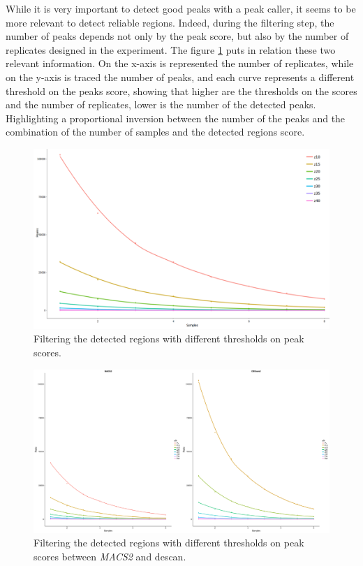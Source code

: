 While it is very important to detect good peaks with a peak caller, it seems to be more relevant to detect reliable regions. Indeed, during the filtering step, the number of peaks depends not only by the peak score, but also by the number of replicates designed in the experiment.
The figure \ref{fig:filteringdescan} puts in relation these two relevant information. 
On the x-axis is represented the number of replicates, while on the y-axis is traced the number of peaks, and each curve represents a different threshold on the peaks score, showing that higher are the thresholds on the scores and the number of replicates, lower is the number of the detected peaks.
Highlighting a proportional inversion between the number of the peaks and the combination of the number of samples and the detected regions score.


\begin{figure}[H]
\includegraphics[width=\textwidth, height=\textheight, keepaspectratio]{img/descan2/filtering.png}
\caption[\gls{descan} filtering step]{Filtering the detected regions with different thresholds on peak scores.}
\label{fig:filteringdescan}
\centering
\end{figure}


\begin{figure}[H]
\includegraphics[width=\textwidth, height=\textheight, keepaspectratio]{img/descan2/filtering_m2_d2.png}
\caption[\gls{descan} and \textit{MACS2} filtering comparison]{Filtering the detected regions with different thresholds on peak scores between \textit{MACS2} and \gls{descan}.}
\label{fig:filteringdescanmacs2}
\centering
\end{figure}

